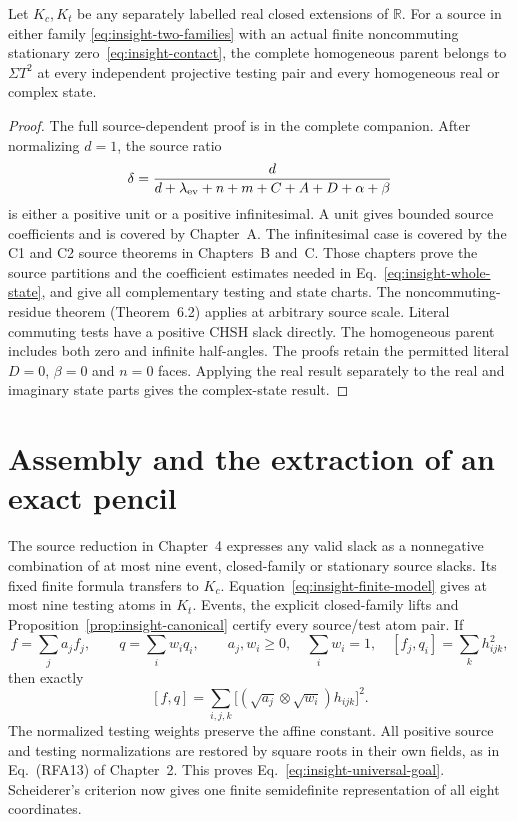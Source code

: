 \begin{proposition}
\label{prop:insight-canonical}
Let $K_c,K_t$ be any separately labelled real closed extensions
of $\mathbb R$. For a source in either family
\eqref{eq:insight-two-families} with an actual finite noncommuting
stationary zero~\eqref{eq:insight-contact}, the complete homogeneous parent
belongs to $\Sigma T^2$ at every independent projective testing
pair and every homogeneous real or complex state.
\end{proposition}
\begin{proof}
The full source-dependent proof is in the complete companion.
After normalizing $d=1$, the source ratio
\[
 \delta={d\over d+\lambda_{\rm ev}+n+m+C+A+D+\alpha+\beta}
\]
is either a positive unit or a positive infinitesimal. A unit
gives bounded source coefficients and is covered by
Chapter~A. The infinitesimal case is covered by the
C1 and C2 source theorems in Chapters~B
and~C. Those chapters prove the source partitions
and the coefficient estimates needed in
Eq.~\eqref{eq:insight-whole-state}, and give all complementary
testing and state charts. The noncommuting-residue theorem
(Theorem~6.2) applies at arbitrary source
scale. Literal commuting tests have a positive CHSH slack directly.
The homogeneous parent includes both zero and infinite half-angles.
The proofs retain the permitted literal $D=0$, $\beta=0$ and
$n=0$ faces. Applying the real result separately to the real and
imaginary state parts gives the complex-state result.
\end{proof}

\section{Assembly and the extraction of an exact pencil}
\label{sec:insight-assembly}

The source reduction in Chapter~4 expresses any
valid slack as a nonnegative combination of at most nine event,
closed-family or stationary source slacks. Its fixed finite formula
transfers to $K_c$. Equation~\eqref{eq:insight-finite-model} gives
at most nine testing atoms in $K_t$. Events, the explicit
closed-family lifts and Proposition~\ref{prop:insight-canonical}
certify every source/test atom pair. If
\[
 f=\sum_j a_jf_j,\qquad q=\sum_iw_iq_i,\qquad
 a_j,w_i\ge0,\quad\sum_iw_i=1,\quad
 [f_j,q_i]=\sum_k h_{ijk}^2,
\]
then exactly
\[
 [f,q]=\sum_{i,j,k}
       \bigl[(\sqrt{a_j}\otimes\sqrt{w_i})h_{ijk}\bigr]^2.
\]
The normalized testing weights preserve the affine constant.
All positive source and testing normalizations are
restored by square roots in their own fields, as in Eq.~(RFA13)
of Chapter~2. This proves
Eq.~\eqref{eq:insight-universal-goal}. Scheiderer's criterion now
gives one finite semidefinite representation of all eight coordinates.

